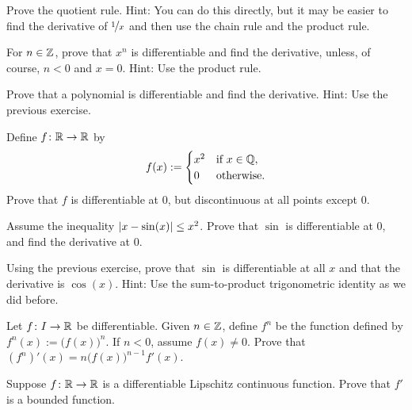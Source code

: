 \begin{exercise}
Prove the quotient rule.  Hint: You can do this directly, but it may be
easier to find the derivative of $\nicefrac{1}{x}$ and then use
the chain rule and the product rule.
\end{exercise}

\begin{exercise} \label{exercise:diffofxn}
For $n \in {\mathbb{Z}}$,
prove that $x^n$ is differentiable and find the derivative,
unless, of course, $n < 0$ and $x=0$.
Hint: Use the product rule.
\end{exercise}

\begin{exercise}
Prove that a polynomial is differentiable and find the derivative.
Hint: Use the previous exercise.
\end{exercise}

\begin{exercise}
Define $f \colon {\mathbb{R}} \to {\mathbb{R}}$ by
\begin{equation*}
f(x) :=
\begin{cases}
x^2 & \text{if } x \in {\mathbb{Q}},\\
0 & \text{otherwise.}
\end{cases}
\end{equation*}
Prove that $f$ is differentiable at $0$, but discontinuous at all points
except $0$.
\end{exercise}

\begin{exercise}
Assume the inequality $\left\lvert {x-\sin(x)} \right\rvert \leq x^2$.  Prove that $\sin$ is
differentiable at $0$, and find the derivative at $0$.
\end{exercise}

\begin{exercise}
Using the previous exercise, prove that $\sin$ is differentiable at all $x$
and that the derivative is $\cos(x)$.  Hint: Use the sum-to-product
trigonometric identity as we did before.
\end{exercise}

\begin{exercise}
Let $f \colon I \to {\mathbb{R}}$ be differentiable.  Given $n \in {\mathbb{Z}}$, define $f^n$
be the function defined by $f^n(x) := {\bigl( f(x) \bigr)}^n$.  If
$n < 0$, assume $f(x) \not= 0$.  Prove that
$(f^n)'(x) = n {\bigl(f(x) \bigr)}^{n-1} f'(x)$.
\end{exercise}

\begin{exercise}
Suppose $f \colon {\mathbb{R}} \to {\mathbb{R}}$ is a differentiable
Lipschitz continuous function.
Prove that $f'$ is a bounded function.
\end{exercise}

